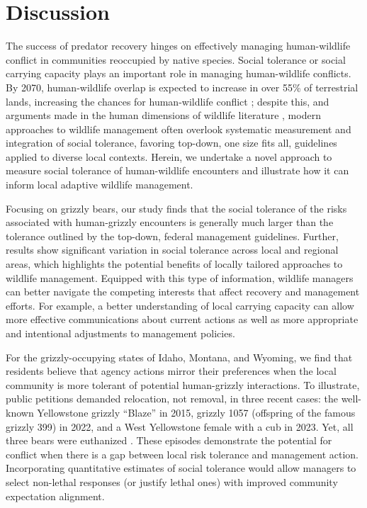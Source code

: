 \documentclass[english,12pt]{article}
\begin{document}
\section{Discussion}
\label{sec: discussion}
The success of predator recovery hinges on effectively managing human-wildlife conflict in communities reoccupied by native species. Social tolerance or social carrying capacity plays an important role in managing human-wildlife conflicts. By 2070, human-wildlife overlap is expected to increase in over 55\% of terrestrial lands, increasing the chances for human-wildlife conflict \citep{ma2024global}; despite this, and arguments made in the human dimensions of wildlife literature \citep{nesbitt_human_2023}, modern approaches to wildlife management often overlook systematic measurement and integration of social tolerance, favoring top-down, one size fits all, guidelines applied to diverse local contexts. Herein, we undertake a novel approach to measure social tolerance of human-wildlife encounters and illustrate how it can inform local adaptive wildlife management. 

Focusing on grizzly bears, our study finds that the social tolerance of the risks associated with human-grizzly encounters is generally much larger than the tolerance outlined by the top-down, federal management guidelines. Further, results show significant variation in social tolerance across local and regional areas, which highlights the potential benefits of locally tailored approaches to wildlife management. Equipped with this type of information, wildlife managers can better navigate the competing interests that affect recovery and management efforts. For example, a better understanding of local carrying capacity can allow more effective communications about current actions as well as more appropriate and intentional adjustments to management policies. 

For the grizzly-occupying states of Idaho, Montana, and Wyoming, we find that residents believe that agency actions mirror their preferences when the local community is more tolerant of potential human-grizzly interactions. To illustrate, public petitions demanded relocation, not removal, in three recent cases: the well-known Yellowstone grizzly ``Blaze'' in 2015, grizzly 1057 (offspring of the famous grizzly 399) in 2022, and a West Yellowstone female with a cub in 2023. Yet, all three bears were euthanized \citep{zuckerman2015euthanization, wp2023grizzly, baitinger2024headless}. These episodes demonstrate the potential for conflict when there is a gap between local risk tolerance and management action. Incorporating quantitative estimates of social tolerance would allow managers to select non-lethal responses (or justify lethal ones) with improved community expectation alignment. 
\end{document}
